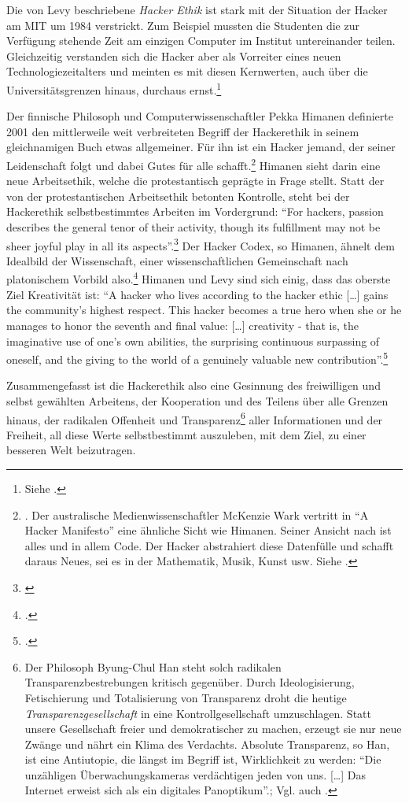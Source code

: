 \documentclass[
paper=164mm:234mm, %
pagesize, %
DIV=calc, %
10pt, %
BCOR=0mm, %
parskip=half- %
]{scrbook}
\begin{document}
Die von Levy beschriebene \emph{Hacker Ethik} ist stark mit der Situation der Hacker am MIT um 1984 verstrickt. Zum Beispiel mussten die Studenten die zur Verfügung stehende Zeit am einzigen Computer im Institut untereinander teilen. Gleichzeitig verstanden sich die Hacker aber als Vorreiter eines neuen Technologiezeitalters und meinten es mit diesen Kernwerten, auch über die Universitätsgrenzen hinaus, durchaus ernst.\footnote{Siehe \cite[26-37]{Levy:1984}.}

Der finnische Philosoph und Computerwissenschaftler Pekka Himanen definierte 2001 den mittlerweile weit verbreiteten Begriff der Hackerethik in seinem gleichnamigen Buch etwas allgemeiner. Für ihn ist ein Hacker jemand, der seiner Leidenschaft folgt und dabei Gutes für alle schafft.\footnote{\cite[3-6]{Himanen:2001}. Der australische Medienwissenschaftler McKenzie Wark vertritt in \enquote{A Hacker Manifesto} eine ähnliche Sicht wie Himanen. Seiner Ansicht nach ist alles und in allem Code. Der Hacker abstrahiert diese Datenfülle und schafft daraus Neues, sei es in der Mathematik, Musik, Kunst usw. Siehe \cite[13]{McKenzie:2006}.} Himanen sieht darin eine neue Arbeitsethik, welche die protestantisch geprägte in Frage stellt. Statt der von der protestantischen Arbeitsethik betonten Kontrolle, steht bei der Hackerethik selbstbestimmtes Arbeiten im Vordergrund: \enquote{For hackers, passion describes the general tenor of their activity, though its fulfillment may not be sheer joyful play in all its aspects}.\footnote{\cite[18]{Himanen:2001}} Der Hacker Codex, so Himanen, ähnelt dem Idealbild der Wissenschaft, einer wissenschaftlichen Gemeinschaft nach platonischem Vorbild also.\footnote{\cite[7-19]{Himanen:2001}.} Himanen und Levy sind sich einig, dass das oberste Ziel Kreativität ist: \enquote{A hacker who lives according to the hacker ethic [\dots] gains the community's highest respect. This hacker becomes a true hero when she or he manages to honor the seventh and final value: [\dots] creativity - that is, the imaginative use of one's own abilities, the surprising continuous surpassing of oneself, and the giving to the world of a genuinely valuable new contribution}.\footnote{\cite[141]{Himanen:2001}.}

Zusammengefasst ist die Hackerethik also eine Gesinnung des freiwilligen und selbst gewählten Arbeitens, der Kooperation und des Teilens über alle Grenzen hinaus, der radikalen Offenheit und Transparenz\footnote{Der Philosoph Byung-Chul Han steht solch radikalen Transparenzbestrebungen kritisch gegenüber. Durch Ideologisierung, Fetischierung und Totalisierung von Transparenz droht die heutige \emph{Transparenzgesellschaft} in eine Kontrollgesellschaft umzuschlagen. Statt unsere Gesellschaft freier und demokratischer zu machen, erzeugt sie nur neue Zwänge und nährt ein Klima des Verdachts. Absolute Transparenz, so Han, ist eine Antiutopie, die längst im Begriff ist, Wirklichkeit zu werden: \enquote{Die unzähligen Überwachungskameras verdächtigen jeden von uns. [\dots] Das Internet erweist sich als ein digitales Panoptikum}.\cite{Han:2012}; Vgl. auch \cite{Han:2013}.} aller Informationen und der Freiheit, all diese Werte selbstbestimmt auszuleben, mit dem Ziel, zu einer besseren Welt beizutragen.
\end{document}
